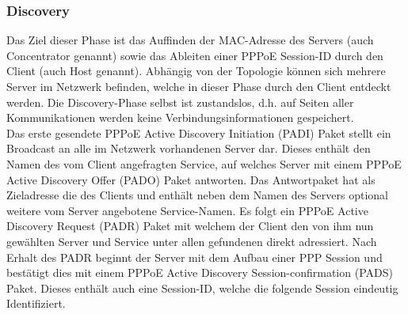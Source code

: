 \documentclass[journal,11pt]{IEEEtran}
\begin{document}
\subsubsection{Discovery}
Das Ziel dieser Phase ist das Auffinden der MAC-Adresse des Servers (auch Concentrator genannt)
sowie das Ableiten einer PPPoE Session-ID durch den Client (auch Host genannt).
Abhängig von der Topologie können sich mehrere Server im Netzwerk befinden, welche in
dieser Phase durch den Client entdeckt werden. Die Discovery-Phase selbst ist zustandslos, d.h.
auf Seiten aller Kommunikationen werden keine Verbindungsinformationen gespeichert.\\
Das erste gesendete PPPoE Active Discovery Initiation (PADI) Paket stellt ein Broadcast
an alle im Netzwerk vorhandenen Server dar. Dieses enthält den Namen des vom Client
angefragten Service, auf welches Server mit einem
PPPoE Active Discovery Offer (PADO) Paket antworten. Das Antwortpaket
hat als Zieladresse die des Clients und enthält neben dem Namen des Servers optional
weitere vom Server angebotene Service-Namen. Es folgt ein PPPoE Active Discovery Request (PADR) Paket
mit welchem der Client den von ihm nun gewählten Server und Service unter allen
gefundenen direkt adressiert. Nach Erhalt des PADR beginnt der Server mit dem Aufbau
einer PPP Session und bestätigt dies mit einem PPPoE Active Discovery Session-confirmation (PADS) Paket.
Dieses enthält auch eine Session-ID, welche die folgende Session eindeutig Identifiziert.\\
%
\end{document}
